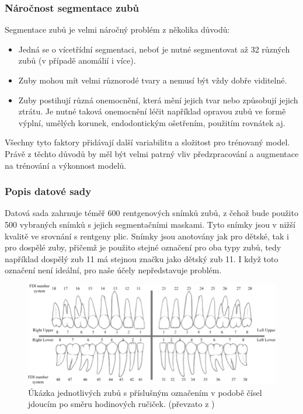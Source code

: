 \documentclass[male,czech,api_ing]{thesis}
\begin{document}
\subsubsection{Náročnost segmentace zubů}
Segmentace zubů je velmi náročný problém z několika důvodů:

\begin{itemize}
    \item Jedná se o vícetřídní segmentaci, neboť je nutné segmentovat až 32 různých zubů (v případě anomálií i více).
    \item Zuby mohou mít velmi různorodé tvary a nemusí být vždy dobře viditelné.
    \item Zuby postihují různá onemocnění, která mění jejich tvar nebo způsobují jejich ztrátu. Je nutné taková onemocnění léčit například opravou zubů ve formě výplní, umělých korunek, endodontickým ošetřením, použitím rovnátek aj.
\end{itemize}

Všechny tyto faktory přidávají další variabilitu a složitost pro trénovaný model. Právě z těchto důvodů by měl být velmi patrný vliv předzpracování a augmentace na trénování a výkonnost modelů.

\subsubsection{Popis datové sady}
Datová sada zahrnuje téměř 600 rentgenových snímků zubů, z čehož bude použito 500 vybraných snímků s jejich segmentačními maskami. Tyto snímky jsou v nižší kvalitě ve srovnání s rentgeny plic. Snímky jsou anotovány jak pro dětské, tak i pro dospělé zuby, přičemž je použito stejné označení pro oba typy zubů, tedy například dospělý zub 11 má stejnou značku jako dětský zub 11. I když toto označení není ideální, pro naše účely nepředstavuje problém.

\begin{figure}[h]
    \centering
    \includegraphics[width=\linewidth]{Prilohy/Obrazky/FDITeethLabels.png}
    \caption{Úkázka jednotlivých zubů s příslušným označením v podobě čísel jdoucím po směru hodinových ručiček. (převzato z \cite{teethLabelImg})}
    \label{fig:teethLabel}
\end{figure}
\end{document}
